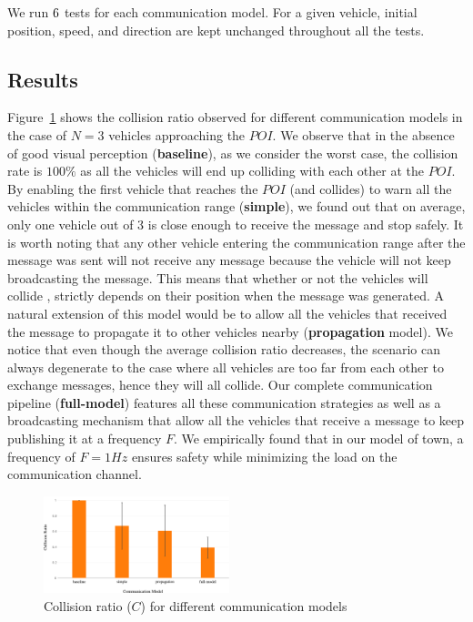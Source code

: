 We run $\num_test_per_scenario$ tests for each communication model. For a given vehicle, initial position,
speed, and direction are kept unchanged throughout all the tests.

\subsection{Results}

Figure~\ref{fig:collision_ratio} shows the collision ratio observed for different communication models in the
case of $N=3$ vehicles approaching the $POI$. We observe that in the absence of good visual perception
(\textbf{baseline}), as we consider the worst case, the collision rate is $100\%$ as all the vehicles will end up
colliding with each other at the $POI$. By enabling the first vehicle that reaches the $POI$ (and collides) to
warn all the vehicles within the communication range (\textbf{simple}), we found out that on
average, only one vehicle out of $3$ is close enough to receive the message and stop safely. It is worth noting
that any other vehicle entering the communication range after the message was sent will not receive any message
because the vehicle will not keep broadcasting the message. This means that whether or not the vehicles will collide
, strictly depends on their position when the message was generated. A natural extension of this model
would be to allow all the vehicles that received the message to propagate it to other vehicles nearby
(\textbf{propagation} model). We notice that even though the average collision ratio decreases,
the scenario can always degenerate to the case where all vehicles are too far from each other to exchange
messages, hence they will all collide.
Our complete communication pipeline (\textbf{full-model}) features all these communication strategies as well
as a broadcasting mechanism that allow all the vehicles that receive a message to keep publishing it at a frequency
$F$. We empirically found that in our model of town, a frequency of $F=1Hz$ ensures safety while minimizing
the load on the communication channel.

\begin{figure}[t]
    \centering
    \includegraphics[width=0.48\textwidth, height=0.24\textwidth]{figures/collision_ratio.pdf}
    \caption{Collision ratio ($C$) for different communication models \label{fig:collision_ratio}}
\end{figure}

